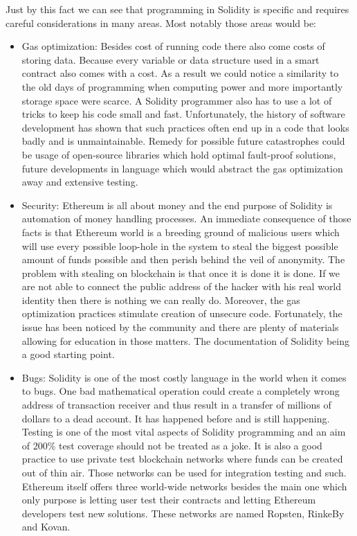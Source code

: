 \documentclass[a4paper,12pt,twoside,openany]{report}
\begin{document}
Just by this fact we can see that programming in Solidity is specific and requires careful considerations in many areas. Most notably those areas would be:
\begin{itemize}
\item Gas optimization: Besides cost of running code there also come costs of storing data. Because every variable or data structure used in a smart contract also comes with a cost. As a result we could notice a similarity to the old days of programming when computing power and more importantly storage space were scarce. A Solidity programmer also has to use a lot of tricks to keep his code small and fast. Unfortunately, the history of software development has shown that such practices often end up in a code that looks badly and is unmaintainable. Remedy for possible future catastrophes could be usage of open-source libraries which hold optimal fault-proof solutions, future developments in language which would abstract the gas optimization away and extensive testing.
\item Security: Ethereum is all about money and the end purpose of Solidity is automation of money handling processes. An immediate consequence of those facts is that Ethereum world is a breeding ground of malicious users which will use every possible loop-hole in the system to steal the biggest possible amount of funds possible and then perish behind the veil of anonymity. The problem with stealing on blockchain is that once it is done it is done. If we are not able to connect the public address of the hacker with his real world identity then there is nothing we can really do. Moreover, the gas optimization practices stimulate creation of unsecure code. Fortunately, the issue has been noticed by the community and there are plenty of materials allowing for education in those matters. The documentation of Solidity being a good starting point. \cite{secure}
\item Bugs: Solidity is one of the most costly language in the world when it comes to bugs. One bad mathematical operation could create a completely wrong address of transaction receiver and thus result in a transfer of millions of dollars to a dead account. It has happened before and is still happening. Testing is one of the most vital aspects of Solidity programming and an aim of 200\% test coverage should not be treated as a joke. It is also a good practice to use private test blockchain networks where funds can be created out of thin air. Those networks can be used for integration testing and such. Ethereum itself offers three world-wide networks besides the main one which only purpose is letting user test their contracts and letting Ethereum developers test new solutions. These networks are named Ropsten, RinkeBy and Kovan. 
\end{itemize}
\end{document}
